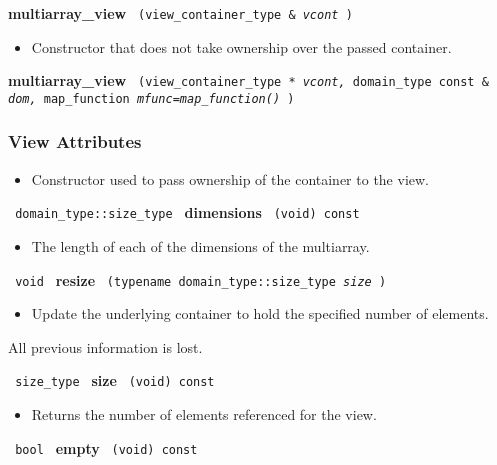 \noindent
\textbf{multiarray\_view}%
\texttt{%
(view\_container\_type \&
\textit{vcont}%
)
}

\begin{itemize}
\item
Constructor that does not take ownership over the passed container.
\end{itemize}

\noindent
\textbf{multiarray\_view}%
\texttt{%
(view\_container\_type *
\textit{vcont,}%
domain\_type const \&
\textit{dom,}%
map\_function
\textit{mfunc=map\_function()}%
)
}

\subsubsection{ View Attributes}

\begin{itemize}
\item
Constructor used to pass ownership of the container to the view.
\end{itemize}

\noindent
\texttt{%
domain\_type::size\_type
}
\newline
\textbf{dimensions}%
\texttt{%
(void) const
}

\begin{itemize}
\item
The length of each of the dimensions of the multiarray.
\end{itemize}

\noindent
\texttt{%
void
}
\newline
\textbf{resize}%
\texttt{%
(typename domain\_type::size\_type
\textit{size}%
)
}

\begin{itemize}
\item
Update the underlying container to hold the specified number of elements.
\end{itemize}
All previous information is lost.

\noindent
\texttt{%
size\_type
}
\newline
\textbf{size}%
\texttt{%
(void) const
}

\begin{itemize}
\item
Returns the number of elements referenced for the view.
\end{itemize}

\noindent
\texttt{%
bool
}
\newline
\textbf{empty}%
\texttt{%
(void) const
}

